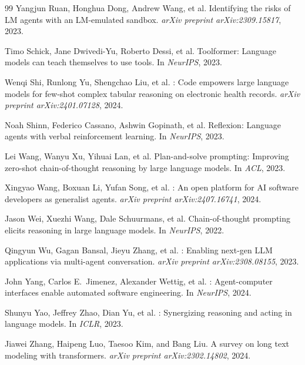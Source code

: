 \documentclass{article}
\begin{document}
\begin{thebibliography}{99}
Yangjun Ruan, Honghua Dong, Andrew Wang, et al.
\newblock Identifying the risks of {LM} agents with an {LM}-emulated sandbox.
\newblock \textit{arXiv preprint arXiv:2309.15817}, 2023.

Timo Schick, Jane Dwivedi-Yu, Roberto Dessi, et al.
\newblock Toolformer: Language models can teach themselves to use tools.
\newblock In \textit{NeurIPS}, 2023.

Wenqi Shi, Runlong Yu, Shengchao Liu, et al.
: Code empowers large language models for few-shot complex tabular reasoning on electronic health records.
\newblock \textit{arXiv preprint arXiv:2401.07128}, 2024.

Noah Shinn, Federico Cassano, Ashwin Gopinath, et al.
\newblock Reflexion: Language agents with verbal reinforcement learning.
\newblock In \textit{NeurIPS}, 2023.

Lei Wang, Wanyu Xu, Yihuai Lan, et al.
\newblock Plan-and-solve prompting: Improving zero-shot chain-of-thought reasoning by large language models.
\newblock In \textit{ACL}, 2023.

Xingyao Wang, Boxuan Li, Yufan Song, et al.
: An open platform for {AI} software developers as generalist agents.
\newblock \textit{arXiv preprint arXiv:2407.16741}, 2024.

Jason Wei, Xuezhi Wang, Dale Schuurmans, et al.
\newblock Chain-of-thought prompting elicits reasoning in large language models.
\newblock In \textit{NeurIPS}, 2022.

Qingyun Wu, Gagan Bansal, Jieyu Zhang, et al.
: Enabling next-gen {LLM} applications via multi-agent conversation.
\newblock \textit{arXiv preprint arXiv:2308.08155}, 2023.

John Yang, Carlos E.\ Jimenez, Alexander Wettig, et al.
: Agent-computer interfaces enable automated software engineering.
\newblock In \textit{NeurIPS}, 2024.

Shunyu Yao, Jeffrey Zhao, Dian Yu, et al.
: Synergizing reasoning and acting in language models.
\newblock In \textit{ICLR}, 2023.

Jiawei Zhang, Haipeng Luo, Taesoo Kim, and Bang Liu.
\newblock A survey on long text modeling with transformers.
\newblock \textit{arXiv preprint arXiv:2302.14802}, 2024.

\end{thebibliography}
\end{document}
